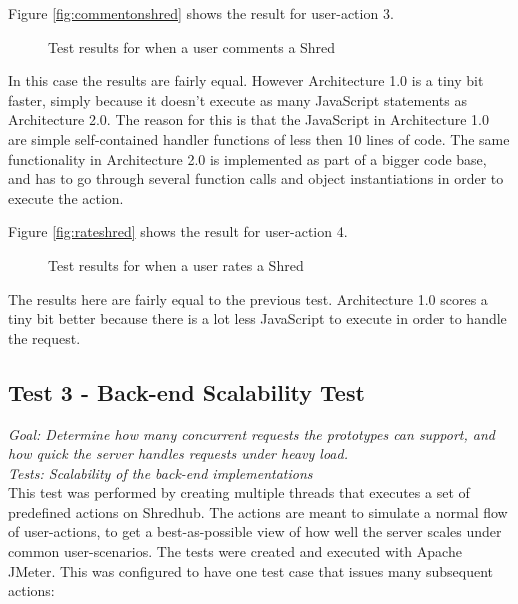 Figure \vref{fig:commentonshred} shows the result for user-action 3. 
\begin{figure}
\begin{center}
\end{center}
\caption{Test results for when a user comments a Shred}\label{fig:commentonshred}
\end{figure}
In this case the results are fairly equal. However Architecture 1.0 is a tiny bit faster, simply because it doesn't execute as many JavaScript statements as Architecture 2.0. The reason for this is that the JavaScript in Architecture 1.0 are simple self-contained handler functions of less then 10 lines of code. The same functionality in Architecture 2.0 is implemented as part of a bigger code base, and has to go through several function calls and object instantiations in order to execute the action.

Figure \vref{fig:rateshred} shows the result for user-action 4. 
\begin{figure}
\begin{center}
\end{center}
\caption{Test results for when a user rates a Shred}\label{fig:rateshred}
\end{figure}
The results here are fairly equal to the previous test. Architecture 1.0 scores a tiny bit better because there is a lot less JavaScript to execute in order to handle the request. 

\subsection{Test 3 - Back-end Scalability Test}
\textit{Goal: Determine how many concurrent requests the prototypes can support, and how quick the server handles requests under heavy load.} \\
\textit{Tests: Scalability of the back-end implementations}\\
This test was performed by creating multiple threads that executes a set of predefined actions on Shredhub. The actions are meant to simulate a normal flow of user-actions, to get a best-as-possible view of how well the server scales under common user-scenarios. The tests were created and executed with Apache JMeter. This was configured to have one test case that issues many subsequent actions: 

